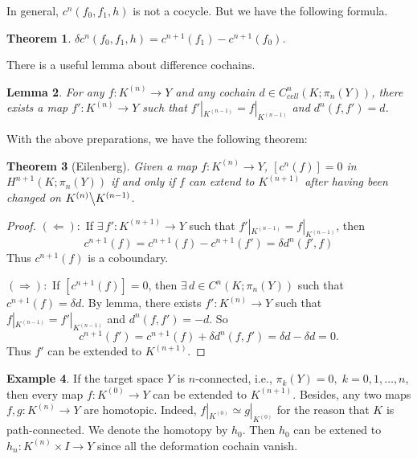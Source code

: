 \documentclass[12pt,a4paper]{article}
\newtheorem{theorem}{\indent Theorem}%
\newtheorem{lemma}[theorem]{\indent Lemma}
\theoremstyle{definition}
\newtheorem{example}[theorem]{\indent Example}
\begin{document}
In general, $c^n(f_0,f_1,h)$ is not a cocycle. But we have the following
formula. 
\begin{theorem}
    $\delta c^n(f_0,f_1,h) = c^{n+1}(f_1) - c^{n+1}(f_0)$.
\end{theorem} 

There is a useful lemma about difference cochains.
\begin{lemma}
    For any $f:K^{(n)}\to Y$ and any cochain $d\in C^n_{cell}(K;\pi_n(Y))$, 
    there exists a map $f':K^{(n)}\to Y$ such that 
    $f'|_{K^{(n-1)}} = f|_{K^{(n-1)}}$ and $d^n(f,f') = d$.
\end{lemma}

With the above preparations, we have the following theorem:
\begin{theorem}[Eilenberg]
    Given a map $f:K^{(n)}\to Y$, $[c^n(f)] = 0$ in 
    $H^{n+1}(K;\pi_n(Y))$ if and only if $f$ can extend to $K^{(n+1)}$ 
    after having been changed on $K^{(n)}\big\backslash K^{(n-1)}$.
\end{theorem}
\begin{proof}
    $(\Leftarrow):$ If $\exists\,f':K^{(n+1)}\to Y$ such that 
    $f'|_{K^{(n-1)}} = f|_{K^{(n-1)}}$, then 
    \begin{equation*}
        c^{n+1}(f) = c^{n+1}(f) - c^{n+1}(f') = \delta d^n(f',f)
    \end{equation*}
    Thus $c^{n+1}(f)$ is a coboundary. 

    $(\Rightarrow):$ If  $[c^{n+1}(f)]=0$, then $\exists\,d\in C^n(K;\pi_n(Y))$ 
    such that $c^{n+1}(f) = \delta d$. By lemma, there exists 
    $f':K^{(n)}\to Y$ such that $f|_{K^{(n-1)}} = f'|_{K^{(n-1)}}$ and 
    $d^n(f,f') = -d$. So 
    \begin{equation*}
        c^{n+1}(f') = c^{n+1}(f) + \delta d^n(f,f') = \delta d - \delta d = 0.
    \end{equation*}
    Thus $f'$ can be extended to $K^{(n+1)}$.
\end{proof}

\begin{example}
    If the target space $Y$ is $n$-connected, i.e., 
    $\pi_k(Y)=0,\; k=0,1,\dots,n$, then every map $f:K^{(0)}\to Y$ can be 
    extended to $K^{(n+1)}$. Besides, any two maps $f,g:K^{(n)}\to Y$ are 
    homotopic. Indeed, $f|_{K^{(0)}}\simeq g|_{K^{(0)}}$ for the reason that 
    $K$ is path-connected. We denote the homotopy by $h_0$. Then $h_0$ can 
    be extened to $h_n:K^{(n)}\times I\to Y$ since all the deformation cochain 
    vanish.
\end{example}
\end{document}
